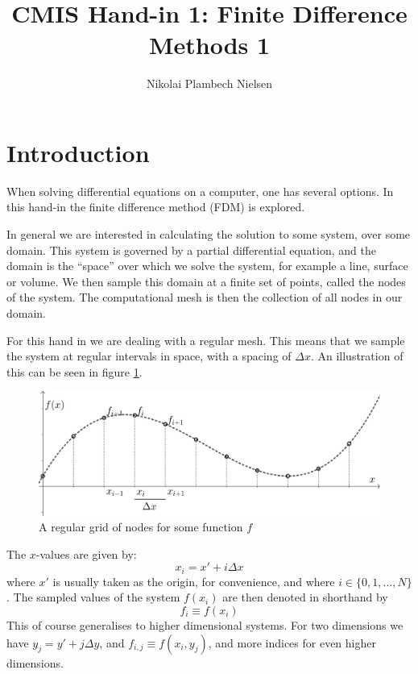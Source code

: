 \documentclass[sigconf]{acmart}
\begin{document}
%
\title{CMIS Hand-in 1: Finite Difference Methods 1}

\author{Nikolai Plambech Nielsen}


\maketitle

\section{Introduction}
When solving differential equations on a computer, one has several options. In this hand-in the finite difference method (FDM) is explored.

In general we are interested in calculating the solution to some system, over some domain. This system is governed by a partial differential equation, and the domain is the ``space'' over which we solve the system, for example a line, surface or volume. We then sample this domain at a finite set of points, called the nodes of the system. The computational mesh is then the collection of all nodes in our domain.

For this hand in we are dealing with a regular mesh. This means that we sample the system at regular intervals in space, with a spacing of $ \Delta x $. An illustration of this can be seen in figure \ref{fig:reg_grid}.
\begin{figure}
	\includegraphics[width=\linewidth]{finite_difference1.png}
	\caption{A regular grid of nodes for some function $ f $}
	\label{fig:reg_grid}
\end{figure}

The $ x $-values are given by:
\begin{equation}\label{key}
	x_i = x' + i \Delta x
\end{equation}
where $ x' $ is usually taken as the origin, for convenience, and where $ i \in \{0,1,...,N\} $. The sampled values of the system $ f(x_i) $ are then denoted in shorthand by
\begin{equation}\label{key}
	f_i \equiv f(x_i)
\end{equation}
This of course generalises to higher dimensional systems. For two dimensions we have $ y_j = y' + j \Delta y$, and $ f_{i,j} \equiv f(x_i, y_j) $, and more indices for even higher dimensions.
\end{document}
